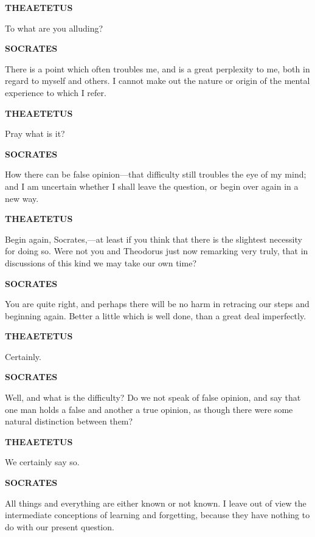 \documentclass[11pt,letter]{article}
\begin{document}
\par \textbf{THEAETETUS}
\par   To what are you alluding?

\par \textbf{SOCRATES}
\par   There is a point which often troubles me, and is a great perplexity to me, both in regard to myself and others. I cannot make out the nature or origin of the mental experience to which I refer.

\par \textbf{THEAETETUS}
\par   Pray what is it?

\par \textbf{SOCRATES}
\par   How there can be false opinion—that difficulty still troubles the eye of my mind; and I am uncertain whether I shall leave the question, or begin over again in a new way.

\par \textbf{THEAETETUS}
\par   Begin again, Socrates,—at least if you think that there is the slightest necessity for doing so. Were not you and Theodorus just now remarking very truly, that in discussions of this kind we may take our own time?

\par \textbf{SOCRATES}
\par   You are quite right, and perhaps there will be no harm in retracing our steps and beginning again. Better a little which is well done, than a great deal imperfectly.

\par \textbf{THEAETETUS}
\par   Certainly.

\par \textbf{SOCRATES}
\par   Well, and what is the difficulty? Do we not speak of false opinion, and say that one man holds a false and another a true opinion, as though there were some natural distinction between them?

\par \textbf{THEAETETUS}
\par   We certainly say so.

\par \textbf{SOCRATES}
\par   All things and everything are either known or not known. I leave out of view the intermediate conceptions of learning and forgetting, because they have nothing to do with our present question.
\end{document}
